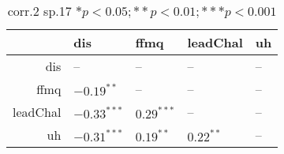 \begin{table}[ht]
\centering
\begin{tabular}{rllll}
  \hline
 & dis & ffmq & leadChal & uh \\ 
  \hline
dis & -- & -- & -- & -- \\ 
  ffmq & $-0.19^{**}$ & -- & -- & -- \\ 
  leadChal & $-0.33^{***}$ & $0.29^{***}$ & -- & -- \\ 
  uh & $-0.31^{***}$ & $0.19^{**}$ & $0.22^{**}$ & -- \\ 
   \hline
\end{tabular}
\caption{corr.2 sp.17 $* p < 0.05; ** p < 0.01; *** p < 0.001$} 
\label{freq_corr.corr.2.sp.17}
\end{table}
